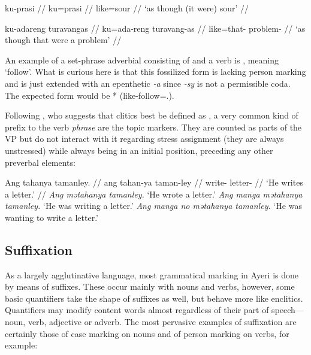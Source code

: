 \a\begingl
	\gla ku-prasi //
	\glb ku=prasi //
	\glc like=sour //
	\glft `as though (it were) sour' //
\endgl

\a\begingl
	\gla ku-adareng turavangas //
	\glb ku=ada-reng turavang-as //
	\glc like=that-\AargI{} problem-\Parg{} //
	\glft `as though that were a problem' //
\endgl
\xe

An example of a set-phrase adverbial consisting of  and a verb 
is ,  meaning `follow'. 
What is curious here is that this fossilized form is lacking person marking 
and is just extended with an epenthetic \textit{-a} since \textit{-sy} is not 
a permissible coda. The expected form would be 
* (like-follow=\TsgI{}.\Aarg{}).

Following \citet{klavans1985}, who suggests that clitics best be defined as
, a very common 
kind of prefix to the verb \emph{phrase} are the topic markers. They are
counted as parts of the VP but do not interact with it regarding stress
assignment (they are always unstressed) while always being in an initial
position, preceding any other preverbal elements:

\pex
	\a\begingl
		\gla Ang tahanya tamanley. //
		\glb ang tahan-ya taman-ley //
		\glc \AgtT{} write-\TsgM{} letter-\PargI{} //
		\glft `He writes a letter.' //
	\endgl
	\a \textit{Ang mətahanya tamanley.} `He wrote a letter.'
	\a \textit{Ang manga mətahanya tamanley.} `He was writing a letter.'
	\a \textit{Ang manga no mətahanya tamanley.} `He was wanting to write a 
		letter.'
\xe



\subsection{Suffixation}

As a largely agglutinative language, most grammatical marking in Ayeri is done
by means of suffixes. These occur mainly with nouns and verbs, however, some
basic quantifiers take the shape of suffixes as well, but behave more like
enclitics. Quantifiers may modify content words almost regardless of their part
of speech---noun, verb, adjective or adverb. The most pervasive examples of
suffixation are certainly those of case marking on nouns and of person marking
on verbs, for example:

